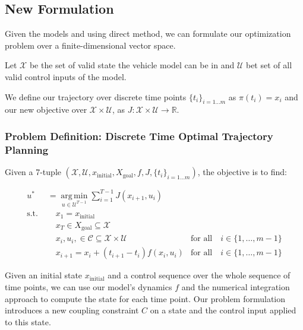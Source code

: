 \subsection{New Formulation}

Given the models and using direct method, we can formulate our optimization problem over a finite-dimensional vector space.

Let $\mathcal{X}$ be the set of valid state the vehicle model can be in and $\mathcal{U}$ bet set of all valid control inputs of the model.

We define our trajectory over discrete time points $\{t_i\}_{i=1\dots m}$ as $\pi(t_i)=x_i$ and our new objective over
$\mathcal{X}\times\mathcal{U}$, as $J: \mathcal{X}\times\mathcal{U}\to \mathbb{R}$.

\subsubsection{Problem Definition: Discrete Time Optimal Trajectory Planning}

Given a 7-tuple $(\mathcal{X}, \mathcal{U}, x_{\text{initial}}, X_{\text{goal}}, f, J, \{t_i\}_{i=1\dots m})$, the objective is to find:

\begin{align}
	u^* & = \underset{u\in \mathcal{U}^{T-1}}{\operatorname{arg\,min}} \sum_{i=1}^{T-1}
	J(x_{i+1}, u_{i})                                                                                                                                                \\ \text{s.t.
	}   & \quad x_1 = x_{\text{initial}}                                                                                                                             \\
	    & \quad x_T \in X_{\text{goal}} \subseteq \mathcal{X}                                                                                                        \\
	    & \quad x_{i},u_{i}, \in \mathcal{C} \subseteq \mathcal{X}\times\mathcal{U}     & \text{for all} \quad i \in \{1,\dots,m-1\} \label{eq:coupling_constraints} \\
	    & \quad x_{i+1} = x_i + (t_{i+1} - t_i)f(x_i,u_i)                               & \text{for all} \quad i \in\{1,\dots,m-1\}	\label{eq:discrete_dynamics}
\end{align}

Given an initial state $x_{\text{initial}}$ and a control sequence over the whole sequence of time points, we can use our model's dynamics $f$ and
the numerical integration approach to compute the state for each time point.
Our problem formulation introduces a new coupling constraint $C$ on a state and the control input applied to this state.

